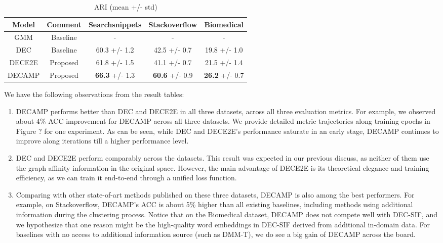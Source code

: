 \documentclass[letterpaper]{article}
\begin{document}
\begin{table*}[t]
\centering
  \begin{tabular}{ | c | c | c | c | c |}
    \hline
    \textbf{Model} & \textbf{Comment} & \textbf{Searchsnippets} & \textbf{Stackoverflow} & \textbf{Biomedical} \\ \hline
    GMM & Baseline  & - & - & - \\ \hline
    DEC & Baseline & 60.3 +\!/\!- 1.2 & 42.5 +\!/\!- 0.7 & 19.8 +\!/\!- 1.0 \\ \hline
    DECE2E & Proposed & 61.8 +\!/\!- 1.5 & 41.1 +\!/\!- 0.7 & 21.5 +\!/\!- 1.4 \\ \hline
    DECAMP &  \hspace{1.6cm}  Proposed \hspace{1.6cm} & \textbf{66.3} +\!/\!- 1.3 & \textbf{60.6} +\!/\!- 0.9 & \textbf{26.2} +\!/\!- 0.7 \\ \hline
    \hline
\end{tabular}
    \caption{ARI (mean +/- std)}
   \label{ari}
\end{table*}
   

We have the following observations from the result tables:
\begin{enumerate}
      \item DECAMP performs better than DEC and DECE2E in all three datasets, across all three evaluation metrics.
      For example, we observed about 4\% ACC improvement for DECAMP across all three datasets. We provide detailed metric trajectories along training epochs in Figure ? for one experiment. As can be seen, while DEC and DECE2E's performance saturate in an early stage, DECAMP continues to improve along iterations till a higher performance level.
      \item DEC and DECE2E perform comparably across the datasets. This result was expected in our previous discuss, as neither of them use the graph affinity information in the original space. However, the main advantage of DECE2E is its theoretical elegance and training efficiency, as we can train it end-to-end through a unified loss function.
      \item Comparing with other state-of-art methods published on these three datasets, DECAMP is also among the best performers. For example, on Stackoverflow, DECAMP's ACC is about 5\% higher than all existing baselines, including methods using additional information during the clustering process. Notice that on the Biomedical dataset, DECAMP does not compete well with DEC-SIF, and we hypothesize that one reason might be the high-quality word embeddings in DEC-SIF derived from additional in-domain data. For baselines with no access to additional information source (such as DMM-T), we do see a big gain of DECAMP across the board.      
\end{enumerate}
\end{document}

